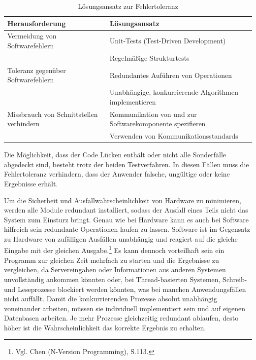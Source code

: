                 \begin{table}[H]
                    \begin{tabularx}{\textwidth}{|X|X|}
                        \hline
                        Herausforderung & Lösungsansatz \\
                        \hline
                        Vermeidung von Softwarefehlern & Unit-Tests (Test-Driven Development) \\
                        & Regelmäßige Strukturtests \\
                        \vspace{0.5\baselineskip} Toleranz gegenüber Softwarefehlern & \vspace{0.5\baselineskip} Redundantes Auführen von Operationen \\
                        & Unabhängige, konkurrierende Algorithmen implementieren \\
                        \vspace{0.5\baselineskip} Missbrauch von Schnittstellen verhindern & \vspace{0.5\baselineskip} Kommunikation von und zur Softwarekomponente spezifieren \\
                        & Verwenden von Kommunikationsstandards \\
                        \hline
                    \end{tabularx}
                    \caption{Lösungsansatz zur Fehlertoleranz}
                \end{table}

                Die Möglichkeit, dass der Code Lücken enthält oder nicht alle Sonderfälle abgedeckt sind, besteht trotz der beiden Testverfahren. In diesen Fällen muss die Fehlertoleranz verhindern, dass der Anwender falsche, ungültige oder keine Ergebnisse erhält.

                Um die Sicherheit und Ausfallwahrscheinlichkeit von Hardware zu minimieren, werden alle Module redundant installiert, sodass der Ausfall eines Teils nicht das System zum Einsturz bringt. Genau wie bei Hardware kann es auch bei Software hilfreich sein redundante Operationen laufen zu lassen. Software ist im Gegensatz zu Hardware von zufälligen Ausfällen unabhängig und reagiert auf die gleiche Eingabe mit der gleichen Ausgabe.\footnote{Vgl. Chen (N-Version Programming), S.113.} Es kann dennoch vorteilhaft sein ein Programm zur gleichen Zeit mehrfach zu starten und die Ergebnisse zu vergleichen, da Servereingaben oder Informationen aus anderen Systemen unvollständig ankommen könnten oder, bei Thread-basierten Systemen, Schreib- und Leseprozesse blockiert werden könnten, was bei manchen Anwendungsfällen nicht auffällt. Damit die konkurrierenden Prozesse absolut unabhängig voneinander arbeiten, müssen sie individuell implementiert sein und auf eigenen Datenbasen arbeiten. Je mehr Prozesse gleichzeitig redundant ablaufen, desto höher ist die Wahrscheinlichkeit das korrekte Ergebnis zu erhalten.

